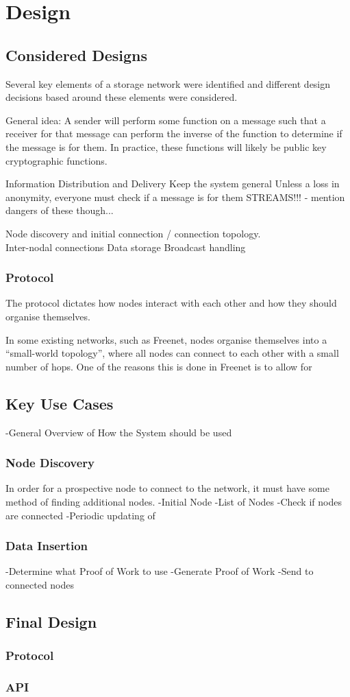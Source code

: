 \section{Design}
	\subsection{Considered Designs}
		Several key elements of a storage network were identified and different design decisions based around these elements were considered.
		
		General idea:
			A sender will perform some function on a message such that a receiver for that message can perform the inverse of the function to determine if the message is for them. In practice, these functions will likely be public key cryptographic functions.
		
		Information Distribution and Delivery
			Keep the system general
			Unless a loss in anonymity, everyone must check if a message is for them
			STREAMS!!! - mention dangers of these though...
			
		Node discovery and initial connection / connection topology.\\
		
		
			
		Inter-nodal connections
		Data storage
		Broadcast handling
		\subsubsection{Protocol}
			The protocol dictates how nodes interact with each other and how they should organise themselves.
			
			In some existing networks, such as Freenet, nodes organise themselves into a ``small-world topology'', where all nodes can connect to each other with a small number of hops. One of the reasons this is done in Freenet is to allow for 
	\subsection{Key Use Cases}
		-General Overview of How the System should be used
		\subsubsection*{Node Discovery}
			In order for a prospective node to connect to the network, it must have some method of finding additional nodes. 
			-Initial Node
			-List of Nodes
			-Check if nodes are connected
			-Periodic updating of 
		\subsubsection*{Data Insertion}
			-Determine what Proof of Work to use
			-Generate Proof of Work
			-Send to connected nodes
			
	\subsection{Final Design}
		\subsubsection{Protocol}
			
		\subsubsection{API}